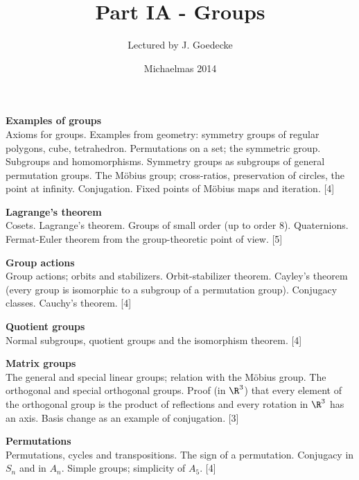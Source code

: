 \documentclass[a4pape]{article}
\title{Part IA - Groups}
\author{Lectured by J. Goedecke}
\date{Michaelmas 2014}
\begin{document}
\maketitle
{\small
\noindent\textbf{Examples of groups}\\
Axioms for groups. Examples from geometry: symmetry groups of regular polygons, cube, tetrahedron. Permutations on a set; the symmetric group. Subgroups and homomorphisms. Symmetry groups as subgroups of general permutation groups. The M\"obius group; cross-ratios, preservation of circles, the point at infinity. Conjugation. Fixed points of M\"obius maps and iteration.\hspace*{\fill} [4]

\vspace{10pt}
\noindent\textbf{Lagrange’s theorem}\\
Cosets. Lagrange’s theorem. Groups of small order (up to order 8). Quaternions. Fermat-Euler theorem from the group-theoretic point of view.\hspace*{\fill} [5]

\vspace{10pt}
\noindent\textbf{Group actions}\\
Group actions; orbits and stabilizers. Orbit-stabilizer theorem. Cayley's theorem (every group is isomorphic to a subgroup of a permutation group). Conjugacy classes. Cauchy's theorem.\hspace*{\fill} [4]

\vspace{10pt}
\noindent\textbf{Quotient groups}\\
Normal subgroups, quotient groups and the isomorphism theorem.\hspace*{\fill} [4]

\vspace{10pt}
\noindent
\textbf{Matrix groups}\\
The general and special linear groups; relation with the M\"obius group. The orthogonal and special orthogonal groups. Proof (in $\R^3$) that every element of the orthogonal group is the product of reflections and every rotation in $\R^3$ has an axis. Basis change as an example of conjugation.\hspace*{\fill} [3]

\vspace{10pt}
\noindent\textbf{Permutations}\\
Permutations, cycles and transpositions. The sign of a permutation. Conjugacy in $S_n$ and in $A_n$. Simple groups; simplicity of $A_5$.\hspace*{\fill} [4]}
\tableofcontents
\newpage
\end{document}
